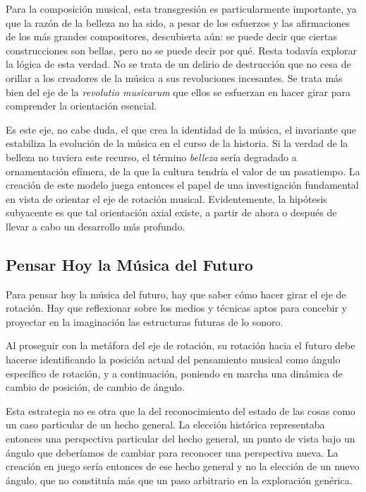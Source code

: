 \documentclass[letterpaper,12pt]{book}
\theoremstyle{definition} \newtheorem{Def}{Definición}[chapter]
\theoremstyle{definition} \newtheorem{Teo}{Teorema}[chapter]
\theoremstyle{definition} \newtheorem{Pro}{Proposición}[chapter]
\theoremstyle{definition} \newtheorem{Lema}{Lema}[chapter]
\begin{document}
 Para la composición musical, esta transgresión es particularmente importante, ya que la razón de la belleza no ha sido, a pesar de los esfuerzos  y las afirmaciones de los más grandes compositores, descubierta aún: se puede decir que ciertas construcciones son bellas, pero no se puede decir por qué. Resta todavía explorar la lógica de esta verdad. No se trata de un delirio de destrucción que no cesa de orillar a los creadores de la música a sus revoluciones incesantes. Se trata más bien del eje de la \emph{revolutio musicarum} que ellos se esfuerzan en hacer girar para comprender la orientación esencial. 
 
 Es este eje, no cabe duda, el que crea la identidad de la música, el invariante que estabiliza la evolución de la música en el curso de la historia. Si la verdad de la belleza no tuviera este recurso, el término \emph{belleza} sería degradado a ornamentación efímera, de la que la cultura tendría el valor de un pasatiempo. La creación de este modelo juega entonces el papel de una investigación fundamental en vista de orientar el eje de rotación musical. Evidentemente, la hipótesis subyacente es que tal orientación axial existe, a partir de ahora o después de llevar a cabo un desarrollo más profundo.
 
\subsection{Pensar Hoy la Música del Futuro}
 
 Para pensar hoy la música del futuro, hay que saber cómo hacer girar el eje de rotación. Hay que reflexionar sobre los medios y técnicas aptos para concebir y proyectar en la imaginación las estructuras futuras de lo sonoro. 
 
 Al proseguir con la metáfora del eje de rotación, su rotación hacia el futuro debe hacerse identificando la posición actual del pensamiento musical como ángulo específico de rotación, y a continuación, poniendo en marcha una dinámica de cambio de posición, de cambio de ángulo.
 
 Esta estrategia no es otra que la del reconocimiento del estado de las cosas como un caso particular de un hecho general. La elección histórica representaba entonces una perspectiva particular del hecho general, un punto de vista bajo un ángulo que deberíamos de cambiar para reconocer una perspectiva nueva. La creación en juego sería entonces de ese hecho general y no la elección de un nuevo ángulo, que no constituía más que un paso arbitrario en la exploración genérica.
 
\end{document}
